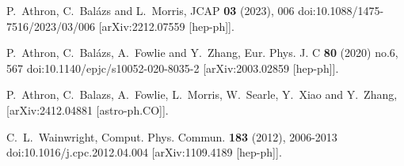 P.~Athron, C.~Bal\'azs and L.~Morris,
JCAP \textbf{03} (2023), 006
doi:10.1088/1475-7516/2023/03/006
[arXiv:2212.07559 [hep-ph]].

P.~Athron, C.~Bal\'azs, A.~Fowlie and Y.~Zhang,
Eur. Phys. J. C \textbf{80} (2020) no.6, 567
doi:10.1140/epjc/s10052-020-8035-2
[arXiv:2003.02859 [hep-ph]].

P.~Athron, C.~Balazs, A.~Fowlie, L.~Morris, W.~Searle, Y.~Xiao and Y.~Zhang,
[arXiv:2412.04881 [astro-ph.CO]].

C.~L.~Wainwright,
Comput. Phys. Commun. \textbf{183} (2012), 2006-2013
doi:10.1016/j.cpc.2012.04.004
[arXiv:1109.4189 [hep-ph]].

